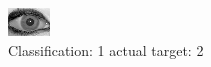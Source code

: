 \begin{figure}[h!]
\begin{center}
\includegraphics[width=0.60\columnwidth]{figures/ID2001_class_1_target_2.png}
\end{center}
\caption{ Classification: 1 actual target: 2}
\label{fig:ID2001_class_1_target_2}
\end{figure}
